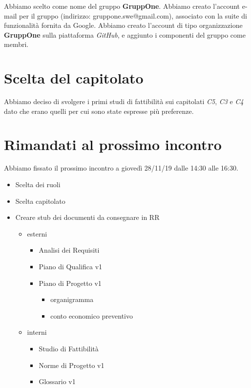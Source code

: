 \documentclass{article}
\begin{document}
Abbiamo scelto come nome del gruppo \textbf{GruppOne}.
Abbiamo creato l'account e-mail per il gruppo (indirizzo: gruppone.swe@gmail.com), associato con la suite di funzionalità fornita da Google.
Abbiamo creato l'account di tipo organizzazione \textbf{GruppOne} sulla piattaforma \textit{GitHub}, e aggiunto i componenti del gruppo come membri.

\section{Scelta del capitolato}%
\label{sec:scelta_del_capitolato}
Abbiamo deciso di svolgere i primi studi di fattibilità sui capitolati \textit{C5}, \textit{C3} e \textit{C4} dato che erano quelli per cui sono state espresse più preferenze.

\section{Rimandati al prossimo incontro}%
\label{sec:rimandati_al_prossimo_incontro}

Abbiamo fissato il prossimo incontro a giovedì 28/11/19 dalle 14:30 alle 16:30.

\begin{itemize}
  \item Scelta dei ruoli
  \item Scelta capitolato
  \item Creare stub dei documenti da consegnare in RR
        \begin{itemize}
          \item esterni
                \begin{itemize}
                  \item Analisi dei Requisiti
                  \item Piano di Qualifica v1
                  \item Piano di Progetto v1
                        \begin{itemize}
                          \item organigramma
                          \item conto economico preventivo
                        \end{itemize}
                \end{itemize}
          \item interni
                \begin{itemize}
                  \item Studio di Fattibilità
                  \item Norme di Progetto v1
                  \item Glossario v1
                \end{itemize}
        \end{itemize}
\end{itemize}
\end{document}
